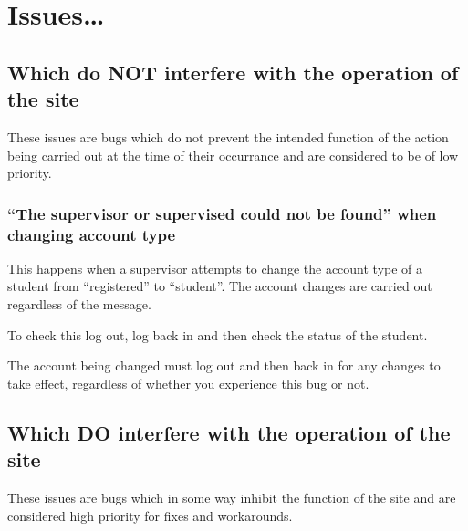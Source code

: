 \documentclass[]{book}
\begin{document}
\hypertarget{issues}{%
\section*{Issues\ldots{}}\label{issues}}

\hypertarget{which-do-not-interfere-with-the-operation-of-the-site}{%
\subsection*{Which do NOT interfere with the operation of the site}\label{which-do-not-interfere-with-the-operation-of-the-site}}

These issues are bugs which do not prevent the intended function of the action being carried out at the time of their occurrance and are considered to be of low priority.

\hypertarget{notfound}{%
\subsubsection*{``The supervisor or supervised could not be found'' when changing account type}\label{notfound}}

This happens when a supervisor attempts to change the account type of a student from ``registered'' to ``student''. The account changes are carried out regardless of the message.

To check this log out, log back in and then check the status of the student.

\begin{info}
The account being changed must log out and then back in for any changes
to take effect, regardless of whether you experience this bug or not.
\end{info}

\hypertarget{which-do-interfere-with-the-operation-of-the-site}{%
\subsection*{Which DO interfere with the operation of the site}\label{which-do-interfere-with-the-operation-of-the-site}}

These issues are bugs which in some way inhibit the function of the site and are considered high priority for fixes and workarounds.
\end{document}
